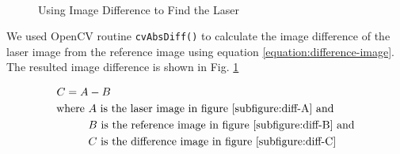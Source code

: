 \begin{figure}[ht!]
\centering
{} \hfill
{} \\
 \hfill
\caption{Using Image Difference to Find the Laser}
\label{figure:difference-image}
\end{figure}

We used OpenCV routine \texttt{cvAbsDiff()} to calculate the image difference
of the laser image from the reference image using equation
\ref{equation:difference-image}. The resulted image difference is shown in
Fig. \ref{figure:difference-image}

\begin{align}
\label{equation:difference-image}
C = A &- B \\
\text{where}~
&A~ \text{is the laser image in figure \ref{subfigure:diff-A} and} \notag \\
&B~ \text{is the reference image in figure \ref{subfigure:diff-B} and} \notag \\
&C~ \text{is the difference image in figure \ref{subfigure:diff-C}} \notag
\end{align}

